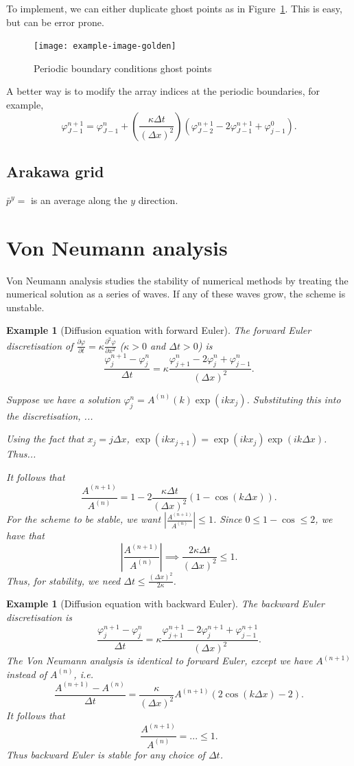 \documentclass[11pt, a4paper]{article}
\renewcommand{\phi}{\varphi}
\theoremstyle{break}
\newtheorem{eg}[thm]{Example}
\newcommand*{\Size}[1]{{\left|#1\right|}}%
\newcommand*{\Paren}[1]{\left(#1\right)}%
\newcommand{\dt}{\Delta t}
\newcommand{\dx}{\Delta x}
\newcommand{\der}[2]{\frac{\partial #1}{\partial #2}}
\newcommand{\pder}[3][2]{\frac{\partial^#1 #2}{\partial #3^#1}}
\begin{document}
To implement, we can either duplicate ghost points as in Figure~\ref{fig:periodicGhost}. This is easy, but can be error prone.
\begin{figure}\centering
	\texttt{[image: example-image-golden]}
	\caption{Periodic boundary conditions ghost points}\label{fig:periodicGhost}
\end{figure}

A better way is to modify the array indices at the periodic boundaries, for example,\[\phi_{J-1}^{n+1}=\phi_{J-1}^n+\Paren{\frac{\kappa\dt}{(\dx)^2}}\Paren{\phi_{J-2}^{n+1}-2\phi_{J-1}^{n+1}+\phi^{0}_{j-1}}.\]

\subsection{Arakawa grid}

$\bar{p}^y=$ is an average along the $y$ direction.


\section{Von Neumann analysis}\label{sec:vonNeumann}
\newcommand{\A}[1]{A^{(#1)}}
Von Neumann analysis studies the stability of numerical methods by treating the numerical solution as a series of waves. If any of these waves grow, the scheme is unstable.
\begin{eg}[Diffusion equation with forward Euler]
	The forward Euler discretisation of $\der\phi t=\kappa\pder\phi x$ ($\kappa>0$ and $\dt>0$) is \[\frac{\phi_j^{n+1}-\phi_j^n}{\dt}=\kappa\frac{\phi_{j+1}^n-2\phi_j^n+\phi^n_{j-1}}{(\dx)^2}.\]
	

	Suppose we have a solution $\phi_j^n=\A{n}(k)\exp(ikx_j)$. Substituting this into the discretisation, ...
	
	Using the fact that $x_j=j\dx$, $\exp(ikx_{j+1})=\exp(ikx_j)\exp(ik\dx)$. Thus...
	
	It follows that \[ \frac{\A{n+1}}{\A n}= 1-2\frac{\kappa \dt}{(\dx)^2}(1-\cos( k\dx)).\] For the scheme to be stable, we want $\Size{\frac{\A{n+1}}{\A n}} \leq1$. Since $0\leq 1-\cos\leq 2$, we have that \[\Size{\frac{\A{n+1}}{\A n}} \implies \frac{2\kappa\dt}{(\dx)^2}\leq 1.\] Thus, for stability, we need $\dt \leq \frac{(\dx)^2}{2\kappa}$.
\end{eg}
\begin{eg}[Diffusion equation with backward Euler]The backward Euler discretisation is 
	\[\frac{\phi_j^{n+1}-\phi_j^n}{\dt}=\kappa\frac{\phi_{j+1}^{n+1}-2\phi_j^{n+1}+\phi^{n+1}_{j-1}}{(\dx)^2}.\] The Von Neumann analysis is identical to forward Euler, except we have $\A{n+1}$ instead of $\A n$, i.e. 
	\[\frac{\A{n+1}-\A n}{\dt}=\frac{\kappa}{(\dx)^2}\A{n+1}(2\cos (k\dx)-2).\] It follows that \[\frac{\A{n+1}}{\A n} =... \leq 1.\] Thus backward Euler is stable for any choice of $\dt$. 
\end{eg}
\end{document}
